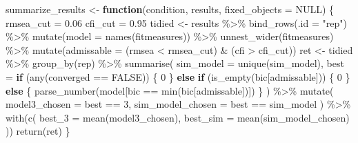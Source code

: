 \documentclass[
  man,floatsintext]{apa6}
\newenvironment{Shaded}{\begin{snugshade}}{\end{snugshade}}
\newcommand{\AttributeTok}[1]{\textcolor[rgb]{0.77,0.63,0.00}{#1}}
\newcommand{\ConstantTok}[1]{\textcolor[rgb]{0.00,0.00,0.00}{#1}}
\newcommand{\ControlFlowTok}[1]{\textcolor[rgb]{0.13,0.29,0.53}{\textbf{#1}}}
\newcommand{\DecValTok}[1]{\textcolor[rgb]{0.00,0.00,0.81}{#1}}
\newcommand{\FloatTok}[1]{\textcolor[rgb]{0.00,0.00,0.81}{#1}}
\newcommand{\FunctionTok}[1]{\textcolor[rgb]{0.00,0.00,0.00}{#1}}
\newcommand{\NormalTok}[1]{#1}
\newcommand{\OtherTok}[1]{\textcolor[rgb]{0.56,0.35,0.01}{#1}}
\newcommand{\SpecialCharTok}[1]{\textcolor[rgb]{0.00,0.00,0.00}{#1}}
\newcommand{\StringTok}[1]{\textcolor[rgb]{0.31,0.60,0.02}{#1}}
\begin{document}
\begin{Shaded}
\begin{Highlighting}[]
\NormalTok{summarize\_results }\OtherTok{\textless{}{-}}
  \ControlFlowTok{function}\NormalTok{(condition, results, }\AttributeTok{fixed\_objects =} \ConstantTok{NULL}\NormalTok{) \{}
\NormalTok{    rmsea\_cut }\OtherTok{=} \FloatTok{0.06}
\NormalTok{    cfi\_cut }\OtherTok{=} \FloatTok{0.95}
\NormalTok{    tidied }\OtherTok{\textless{}{-}}\NormalTok{ results }\SpecialCharTok{\%\textgreater{}\%}
      \FunctionTok{bind\_rows}\NormalTok{(}\AttributeTok{.id =} \StringTok{"rep"}\NormalTok{) }\SpecialCharTok{\%\textgreater{}\%}
      \FunctionTok{mutate}\NormalTok{(}\AttributeTok{model =} \FunctionTok{names}\NormalTok{(fitmeasures)) }\SpecialCharTok{\%\textgreater{}\%}
      \FunctionTok{unnest\_wider}\NormalTok{(fitmeasures) }\SpecialCharTok{\%\textgreater{}\%}
      \FunctionTok{mutate}\NormalTok{(}\AttributeTok{admissable =}\NormalTok{ (rmsea }\SpecialCharTok{\textless{}}\NormalTok{ rmsea\_cut) }\SpecialCharTok{\&}\NormalTok{ (cfi }\SpecialCharTok{\textgreater{}}\NormalTok{ cfi\_cut))}
\NormalTok{    ret }\OtherTok{\textless{}{-}}
\NormalTok{      tidied }\SpecialCharTok{\%\textgreater{}\%}
        \FunctionTok{group\_by}\NormalTok{(rep) }\SpecialCharTok{\%\textgreater{}\%}
        \FunctionTok{summarise}\NormalTok{(}
          \AttributeTok{sim\_model =} \FunctionTok{unique}\NormalTok{(sim\_model),}
          \AttributeTok{best =} \ControlFlowTok{if}\NormalTok{ (}\FunctionTok{any}\NormalTok{(converged }\SpecialCharTok{==} \ConstantTok{FALSE}\NormalTok{)) \{}
            \DecValTok{0}
\NormalTok{          \} }\ControlFlowTok{else} \ControlFlowTok{if}\NormalTok{ (}\FunctionTok{is\_empty}\NormalTok{(bic[admissable])) \{}
            \DecValTok{0}
\NormalTok{          \} }\ControlFlowTok{else}\NormalTok{ \{}
            \FunctionTok{parse\_number}\NormalTok{(model[bic }\SpecialCharTok{==} \FunctionTok{min}\NormalTok{(bic[admissable])])}
\NormalTok{          \}}
\NormalTok{        ) }\SpecialCharTok{\%\textgreater{}\%}
        \FunctionTok{mutate}\NormalTok{(}
          \AttributeTok{model3\_chosen =}\NormalTok{ best }\SpecialCharTok{==} \DecValTok{3}\NormalTok{,}
          \AttributeTok{sim\_model\_chosen =}\NormalTok{ best }\SpecialCharTok{==}\NormalTok{ sim\_model}
\NormalTok{        ) }\SpecialCharTok{\%\textgreater{}\%}
        \FunctionTok{with}\NormalTok{(}\FunctionTok{c}\NormalTok{(}
          \AttributeTok{best\_3 =} \FunctionTok{mean}\NormalTok{(model3\_chosen),}
          \AttributeTok{best\_sim =} \FunctionTok{mean}\NormalTok{(sim\_model\_chosen)}
\NormalTok{        ))}
      \FunctionTok{return}\NormalTok{(ret)}
\NormalTok{  \}}
\end{Highlighting}
\end{Shaded}
\end{document}
